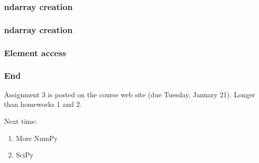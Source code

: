 \documentclass{beamer}
\begin{document}
\begin{frame}
\frametitle{ndarray creation}
\end{frame}

\begin{frame}
\frametitle{ndarray creation}
\end{frame}

\begin{frame}
\frametitle{Element access}
\end{frame}

\begin{frame}
\frametitle{End}

Assignment 3 is posted on the course web site (due Tuesday, January 21).  Longer than homeworks 1 and 2.

\vspace{0.2in}

Next time:
\begin{enumerate}
\setlength{\itemsep}{0.05in}
\item{More NumPy}
\item{SciPy}
\end{enumerate}

\end{frame}
\end{document}
